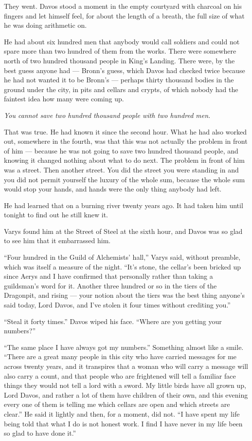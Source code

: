 They went. Davos stood a moment in the empty courtyard with charcoal on his fingers and let himself feel, for about the length of a breath, the full size of what he was doing arithmetic on.

He had about six hundred men that anybody would call soldiers and could not spare more than two hundred of them from the works. There were somewhere north of two hundred thousand people in King’s Landing. There were, by the best guess anyone had — Bronn’s guess, which Davos had checked twice because he had not wanted it to be Bronn’s — perhaps thirty thousand bodies in the ground under the city, in pits and cellars and crypts, of which nobody had the faintest idea how many were coming up.

\textit{You cannot save two hundred thousand people with two hundred men.}

That was true. He had known it since the second hour. What he had also worked out, somewhere in the fourth, was that this was not actually the problem in front of him — because he was not going to save two hundred thousand people, and knowing it changed nothing about what to do next. The problem in front of him was a street. Then another street. You did the street you were standing in and you did not permit yourself the luxury of the whole sum, because the whole sum would stop your hands, and hands were the only thing anybody had left.

He had learned that on a burning river twenty years ago. It had taken him until tonight to find out he still knew it.

\sceneBreak

Varys found him at the Street of Steel at the sixth hour, and Davos was so glad to see him that it embarrassed him.

“Four hundred in the Guild of Alchemists’ hall,” Varys said, without preamble, which was itself a measure of the night. “It’s stone, the cellar’s been bricked up since Aerys and I have confirmed that personally rather than taking a guildsman’s word for it. Another three hundred or so in the tiers of the Dragonpit, and rising — your notion about the tiers was the best thing anyone’s said today, Lord Davos, and I’ve stolen it four times without crediting you.”

“Steal it forty times.” Davos wiped his face. “Where are you getting your numbers?”

“The same place I have always got my numbers.” Something almost like a smile. “There are a great many people in this city who have carried messages for me across twenty years, and it transpires that a woman who will carry a message will also carry a count, and that people who are frightened will tell a familiar face things they would not tell a lord with a sword. My little birds have all grown up, Lord Davos, and rather a lot of them have children of their own, and this evening every one of them is telling me which cellars are open and which streets are clear.” He said it lightly and then, for a moment, did not. “I have spent my life being told that what I do is not honest work. I find I have never in my life been so glad to have done it.”

